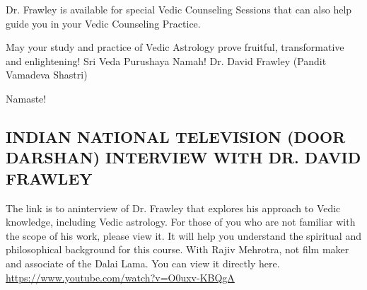 Dr. Frawley is available for special Vedic Counseling Sessions that can also help guide you in your Vedic Counseling Practice.
 

May your study and practice of Vedic Astrology prove fruitful, transformative and enlightening! Sri Veda Purushaya Namah! Dr. David Frawley (Pandit Vamadeva Shastri)  

Namaste! 

\subsection{INDIAN NATIONAL TELEVISION (DOOR DARSHAN) INTERVIEW WITH DR. DAVID FRAWLEY}
The link is to aninterview of Dr. Frawley that explores his approach to Vedic knowledge, including Vedic astrology. For those of you who are not familiar with the scope of his work, please view it. It will help you understand the spiritual and philosophical background for this course. With Rajiv Mehrotra, not film maker and associate of the Dalai Lama. You can view it directly here. \url{https://www.youtube.com/watch?v=O0uxv-KBQgA}

